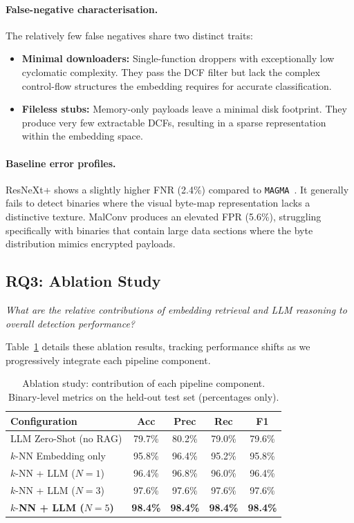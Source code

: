 \documentclass[pdflatex,sn-mathphys-num]{sn-jnl}
\newcommand{\sysname}{\texttt{MAGMA}~}
\begin{document}
\paragraph{False-negative characterisation.}
The relatively few false negatives share two distinct traits:
\begin{itemize}
\item \textbf{Minimal downloaders:} Single-function droppers with exceptionally low
    cyclomatic complexity. They pass the DCF filter but lack the complex
    control-flow structures the embedding requires for accurate classification.
\item \textbf{Fileless stubs:} Memory-only payloads leave a minimal disk
    footprint. They produce very few extractable DCFs, resulting in a sparse
    representation within the embedding space.
\end{itemize}

\paragraph{Baseline error profiles.}
ResNeXt+ shows a slightly higher FNR (2.4\%) compared to \sysname{}. It
generally fails to detect binaries where the visual byte-map representation
lacks a distinctive texture. MalConv produces an elevated FPR (5.6\%),
struggling specifically with binaries that contain large data sections where
the byte distribution mimics encrypted payloads.

\subsection{RQ3: Ablation Study}
\label{sec:rq3}
\textit{What are the relative contributions of embedding retrieval and
LLM reasoning to overall detection performance?}

Table~\ref{tab:ablation} details these ablation results, tracking performance
shifts as we progressively integrate each pipeline component.

\begin{table}[t]
\centering
\caption{Ablation study: contribution of each pipeline component.
Binary-level metrics on the held-out test set (percentages only).}
\label{tab:ablation}
\small
\begin{tabular}{@{}lcccc@{}}
\toprule
\textbf{Configuration} & \textbf{Acc} & \textbf{Prec} & \textbf{Rec} & \textbf{F1} \\
\midrule
LLM Zero-Shot (no RAG) & 79.7\% & 80.2\% & 79.0\% & 79.6\% \\
$k$-NN Embedding only & 95.8\% & 96.4\% & 95.2\% & 95.8\% \\
$k$-NN + LLM ($N{=}1$) & 96.4\% & 96.8\% & 96.0\% & 96.4\% \\
$k$-NN + LLM ($N{=}3$) & 97.6\% & 97.6\% & 97.6\% & 97.6\% \\
$k$-\textbf{NN + LLM ($N{=}5$)} & \textbf{98.4\%} & \textbf{98.4\%} & \textbf{98.4\%} & \textbf{98.4\%} \\
\bottomrule
\end{tabular}
\end{table}
\end{document}
